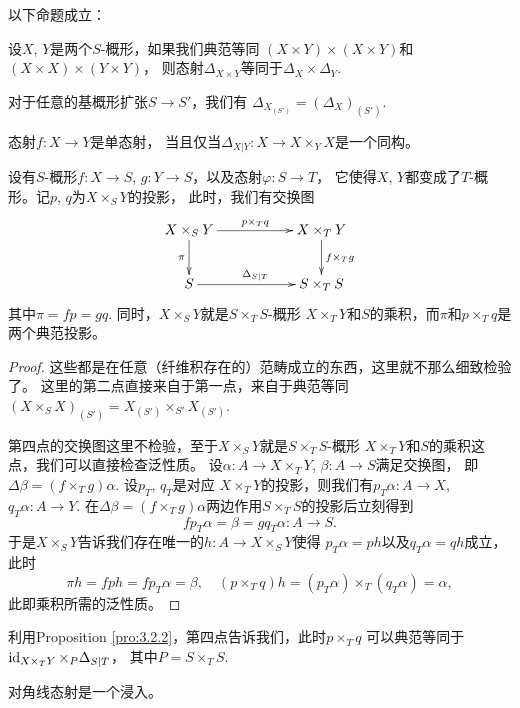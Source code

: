 \begin{pro}\label{pro:4.1.3}
以下命题成立：
\begin{compactenum}
\item 设$X$, $Y$是两个$S$-概形，如果我们典范等同
$(X\times Y)\times (X\times Y)$和$(X\times X)\times (Y\times Y)$，
则态射$\Delta_{X\times Y}$等同于$\Delta_X\times \Delta_Y$.	
\item 对于任意的基概形扩张$S\to S'$，我们有
$\Delta_{X_{(S')}}=(\Delta_{X})_{(S')}$.
\item 态射$f:X\to Y$是单态射，
当且仅当$\Delta_{X|Y}:X\to X\times_Y X$是一个同构。
\item 设有$S$-概形$f:X\to S$, $g:Y\to S$，以及态射$\varphi:S\to T$，
它使得$X$, $Y$都变成了$T$-概形。记$p$, $q$为$X\times_S Y$的投影，
此时，我们有交换图
\[
	\begin{xy}
	\xymatrix{
	X\times_S Y\ar[rr]^{p\times_T q}\ar[d]_{\pi}&&X\times_T Y\ar[d]^{f\times_T g}\\
	S\ar[rr]^{\Delta_{S|T}}&&S\times_TS
	}
	\end{xy}
\]
其中$\pi=fp=gq$. 同时，$X\times_S Y$就是$S\times_T S$-概形
$X\times_T Y$和$S$的乘积，而$\pi$和$p\times_T q$是两个典范投影。
\end{compactenum}	
\end{pro}

\begin{proof}
这些都是在任意（纤维积存在的）范畴成立的东西，这里就不那么细致检验了。
这里的第二点直接来自于第一点，来自于典范等同
$(X\times_S X)_{(S')}=X_{(S')}\times_{S'}X_{(S')}$.

第四点的交换图这里不检验，至于$X\times_S Y$就是$S\times_T S$-概形
$X\times_T Y$和$S$的乘积这点，我们可以直接检查泛性质。
设$\alpha:A\to X \times_T Y$, $\beta:A\to S$满足交换图，
即$\Delta\beta=(f\times_T g)\alpha$. 设$p_T$, $q_T$是对应
$X\times_T Y$的投影，则我们有$p_T\alpha:A\to X$, $q_T\alpha:A\to Y$. 
在$\Delta\beta=(f\times_T g)\alpha$两边作用$S\times_T S$的投影后立刻得到
\[
	fp_T\alpha=\beta=gq_T\alpha:A\to S.
\]
于是$X\times_S Y$告诉我们存在唯一的$h:A\to X\times_S Y$使得
$p_T\alpha=ph$以及$q_T\alpha=qh$成立，此时
\[
	\pi h=fph=fp_T\alpha=\beta, \quad 
	(p\times_T q)h=(p_T\alpha)\times_T (q_T\alpha)=\alpha,
\]
此即乘积所需的泛性质。
\end{proof}

利用Proposition \ref{pro:3.2.2}，第四点告诉我们，此时$p\times_T q$
可以典范等同于$\operatorname{id}_{X\times_T Y}\times_{P}\Delta_{S|T}$，
其中$P=S\times_T S$. 

\begin{lem}\label{lem:4.1.4}
	对角线态射是一个浸入。
\end{lem}

